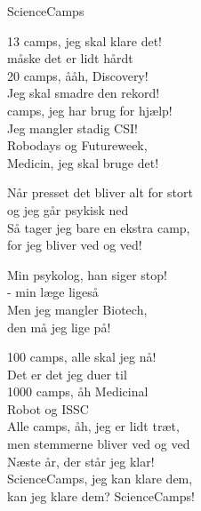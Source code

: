 \begin{song}{ScienceCamps}
  \begin{SBChorus}
    13 camps, jeg skal klare det!\\
    måske det er lidt hårdt\\
    20 camps, ååh, Discovery!\\
    Jeg skal smadre den rekord!\\ camps, jeg har brug for hjælp!\\
    Jeg mangler stadig CSI!\\
    Robodays og Futureweek,\\
    Medicin, jeg skal bruge det!
  \end{SBChorus}

  \begin{SBVerse}
    Når presset det bliver alt for stort\\
    og jeg går psykisk ned\\
    Så tager jeg bare en ekstra camp,\\
    for jeg bliver ved og ved!
  \end{SBVerse}

  \begin{SBVerse}
    Min psykolog, han siger stop!\\
    - min læge ligeså\\
    Men jeg mangler Biotech,\\
    den må jeg lige på!
  \end{SBVerse}

  \begin{SBChorus}
    100 camps, alle skal jeg nå!\\
    Det er det jeg duer til\\
    1000 camps, åh Medicinal\\
    Robot og ISSC\\\medskip
    Alle camps, åh, jeg er lidt træt,\\
    men stemmerne bliver ved og ved\\
    Næste år, der står jeg klar!\\
    ScienceCamps, jeg kan klare dem,\\
    kan jeg klare dem? ScienceCamps!
  \end{SBChorus}
\end{song}